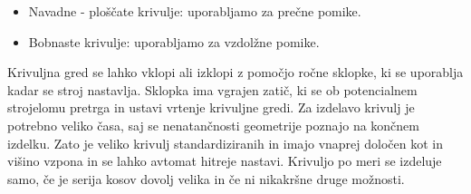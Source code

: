\begin{itemize}
	\item Navadne - ploščate krivulje: uporabljamo za prečne pomike.
	\item Bobnaste krivulje: uporabljamo za vzdolžne pomike.
\end{itemize}

Krivuljna gred se lahko vklopi ali izklopi z pomočjo ročne sklopke,
ki se uporablja kadar se stroj nastavlja. Sklopka ima vgrajen
zatič, ki se ob potencialnem strojelomu pretrga in ustavi vrtenje
krivuljne gredi. Za izdelavo krivulj je potrebno veliko časa, saj
se nenatančnosti geometrije poznajo na končnem izdelku. Zato je
veliko krivulj standardiziranih in imajo vnaprej določen kot in
višino vzpona in se lahko avtomat hitreje nastavi. Krivuljo po
meri se izdeluje samo, če je serija kosov dovolj velika in če ni
nikakršne druge možnosti.

\newpage
